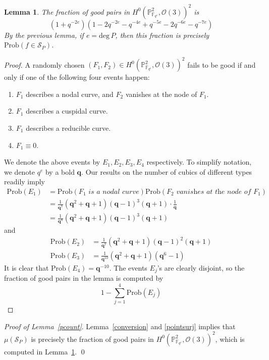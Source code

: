 \documentclass[12pt]{article}
\theoremstyle{plain}
\newtheorem{lemma}[equation]{Lemma}
\theoremstyle{definition}
\newcommand{\IF}{\mathbb{F}}
\newcommand{\IP}{\mathbb{P}}
\newcommand{\sO}{\mathcal{O}}
\newcommand{\sS}{\mathcal{S}}
\renewcommand{\deg}{\mathrm{deg}\,}
\newcommand{\<}{\langle}
\renewcommand{\>}{\rangle}
\newcommand{\Prob}{\mathrm{Prob}}
\begin{document}
\begin{lemma}
\label{prepcount}
The fraction of good pairs in $H^0(\IP^2_{\IF_{q^e}}, \sO(3))^2$ is $$(1 + q^{-2e})(1 - 2q^{-2e} - q^{-4e} + q^{-5e} - 2q^{-6e} -q^{-7e})$$ 
By the previous lemma, if $e = \deg P$, then this fraction is precisely $\Prob(f \in \sS_P)$.
\end{lemma}
\begin{proof}
A randomly chosen $(F_1, F_2) \in H^0(\IP^2_{\IF_{q^e}}, \sO(3))^2$ fails to be good if and only if one of the following four events happen:
\begin{enumerate}
\item $F_1$ describes a nodal curve, and $F_2$ vanishes at the node of $F_1$. 
\item $F_1$ describes a cuspidal curve. 
\item $F_1$ describes a reducible curve. 
\item $F_1 \equiv 0$. 
\end{enumerate} 
We denote the above events by $E_1, E_2, E_3, E_4$ respectively. To simplify notation, we denote $q^e$ by a bold $\pmb{q}$. Our results on the number of cubics of different types readily imply 
\begin{align*}
\Prob(E_1) &= \Prob(F_1 \textit{ is a nodal curve})\Prob(F_2 \textit{ vanishes at the node of } F_1) \\
&= \frac{1}{\pmb{q}^7}(\pmb{q}^2 + \pmb{q} + 1) (\pmb{q} - 1)^3 (\pmb{q} + 1) \cdot \frac{1}{\pmb{q}} \\
&= \frac{1}{\pmb{q}^8}(\pmb{q}^2 + \pmb{q} + 1) (\pmb{q} - 1)^3 (\pmb{q} + 1)
\end{align*}
and 
\begin{align*}
\Prob(E_2) &= \frac{1}{\pmb{q}^7} (\pmb{q}^2 + \pmb{q} + 1) (\pmb{q} - 1)^2 (\pmb{q} + 1)\\
\Prob(E_3) &= \frac{1}{\pmb{q}^{10}} (\pmb{q}^2 + \pmb{q} + 1)(\pmb{q}^6 - 1)
\end{align*}
It is clear that $\Prob(E_4) = \pmb{q}^{-10}$. The events $E_j$'s are clearly disjoint, so the fraction of good pairs in the lemma is computed by 
$$ 1 - \sum_{j = 1}^4 \Prob(E_j) $$
\end{proof}

\noindent \textit{Proof of Lemma~\ref{pcount}}. Lemma~\ref{conversion} and \ref{pointsurj} implies that $\mu(\sS_P)$ is precisely the fraction of good pairs in $H^0(\IP^2_{\IF_{q^e}}, \sO(3))^2$, which is computed in Lemma~\ref{prepcount}. \qed
\end{document}
